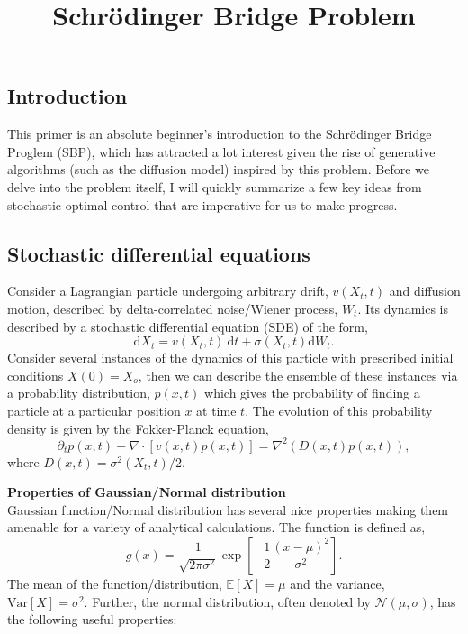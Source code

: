 \documentclass[11pt]{article}
\title{Schr\"odinger Bridge Problem}
\author{}
\date{}
\def\d{\mathrm{d}}
\def\E{\mathbb{E}}
\def\d{\text{d}}
\def\grad{\vec{\nabla}}
\def\N{\mathcal{N}}
\def\var{\mathrm{Var}}
\def\grad{\nabla}
\begin{document}
\maketitle
\begin{singlespace}
\section{Introduction}
This primer is an absolute beginner's introduction to the Schr\"odinger Bridge Proglem (SBP), which has attracted a lot interest given the rise of generative algorithms (such as the diffusion model) inspired by this problem. Before we delve into the problem itself, I will quickly summarize a few key ideas from stochastic optimal control that are imperative for us to make progress.

\subsection{Stochastic differential equations}

Consider a Lagrangian particle undergoing arbitrary drift, $v(X_t, t)$ and diffusion motion, described by delta-correlated noise/Wiener process, $W_t$. Its dynamics is described by a stochastic differential equation (SDE) of the form,
\begin{equation}
    \d X_t = v(X_t, t) \ \d t + \sigma (X_t, t) \d W_t.
\end{equation}
Consider several instances of the dynamics of this particle with prescribed initial conditions $X(0) = X_o$, then we can describe the ensemble of these instances via a probability distribution, $p(x, t)$ which gives the probability of finding a particle at a particular position $x$ at time $t$. The evolution of this probability density is given by the Fokker-Planck equation,
\begin{equation}
    \partial_t p(x, t) + \grad\cdot[v(x, t) p(x, t)] = \grad^2 (D(x, t) p(x, t)),
    \label{eq:FPP}
\end{equation}
where $D(x, t) = \sigma^2(X_t, t)/2$.

\begin{tcolorbox}[colback=gray!20!white,colframe=white,arc=8pt,outer arc=8pt]
    \textbf{\textsf{Properties of Gaussian/Normal distribution}}\\[5pt]
    Gaussian function/Normal distribution has several nice properties making them amenable for a variety of analytical calculations. The function is defined as,
    \[
    g(x)={\frac{1}{{\sqrt {2\pi \sigma^2}}}}\exp \left[-{\frac {1}{2}}{\frac {(x-\mu )^{2}}{\sigma ^{2}}}\right].
    \]
    The mean of the function/distribution, $\E[X] = \mu$ and the variance, $\var [X] = \sigma^2$. Further, the normal distribution, often denoted by $\N(\mu, \sigma)$, has the following useful properties:\\


\end{tcolorbox}
\end{singlespace}
\end{document}
